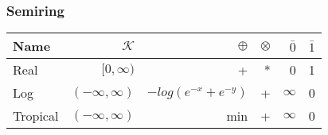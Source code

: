 \begin{frame} \frametitle{Semiring}
\begin{tabular}{lrrrrr}
\hline
Name & $\mathcal{K}$ & $\oplus$ & $ \otimes$ & $\bar{0}$ & $\bar{1}$ \\ 
\hline
Real        & $[0,\infty)$        &  +                     &  * &  0        &  1  \\
Log         & $(-\infty, \infty)$ & $-log(e^{-x} + e^{-y})$ & + &  $\infty$ &  0  \\
Tropical    & $(-\infty, \infty)$ &  min                   &  + &  $\infty$ &  0  \\
\hline
\end{tabular}
\end{frame}

